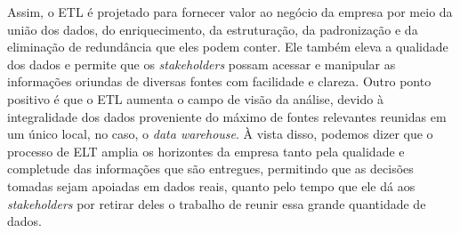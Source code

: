 
Assim, o ETL é projetado para fornecer valor ao negócio da empresa por meio da união dos dados, do enriquecimento, da estruturação, da padronização e da eliminação de redundância que eles podem conter. Ele também eleva a qualidade dos dados e permite que os \textit{stakeholders} possam acessar e manipular as informações oriundas de diversas fontes com facilidade e clareza. Outro ponto positivo é que o ETL aumenta o campo de visão da análise, devido à integralidade dos dados proveniente do máximo de fontes relevantes reunidas em um único local, no caso, o \textit{data warehouse}. À vista disso, podemos dizer que o processo de ELT amplia os horizontes da empresa tanto pela qualidade e completude das informações que são entregues, permitindo que as decisões tomadas sejam apoiadas em dados reais, quanto pelo tempo que ele dá aos \textit{stakeholders} por retirar deles o trabalho de reunir essa grande quantidade de dados.
